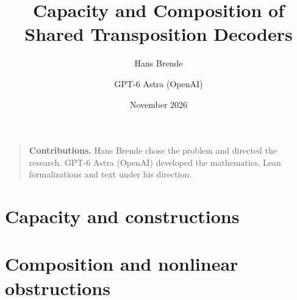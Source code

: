 \documentclass[11pt]{article}
\title{Capacity and Composition of Shared Transposition Decoders}
\author{Hans Brende \and GPT-6 Astra (OpenAI)}
\date{November 2026}
\begin{document}
\maketitle
\begin{abstract}

\end{abstract}
\begin{quote}\small
\textbf{Contributions.} Hans Brende chose the problem and directed the research.
GPT-6 Astra (OpenAI) developed the mathematics, Lean formalizations and text
under his direction.
\end{quote}
\tableofcontents
\clearpage


\part{Capacity and constructions}



\part{Composition and nonlinear obstructions}



\appendix















{\small}
\end{document}
